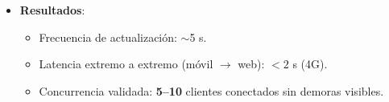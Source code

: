 \begin{itemize}[leftmargin=*]
  \item \textbf{Resultados}:
    \begin{itemize}
      \item Frecuencia de actualización: \(\sim\)5 s.
      \item Latencia extremo a extremo (móvil \(\rightarrow\) web): \(< 2\) s (4G).
      \item Concurrencia validada: \textbf{5–10} clientes conectados sin demoras visibles.
    \end{itemize}
\end{itemize}
